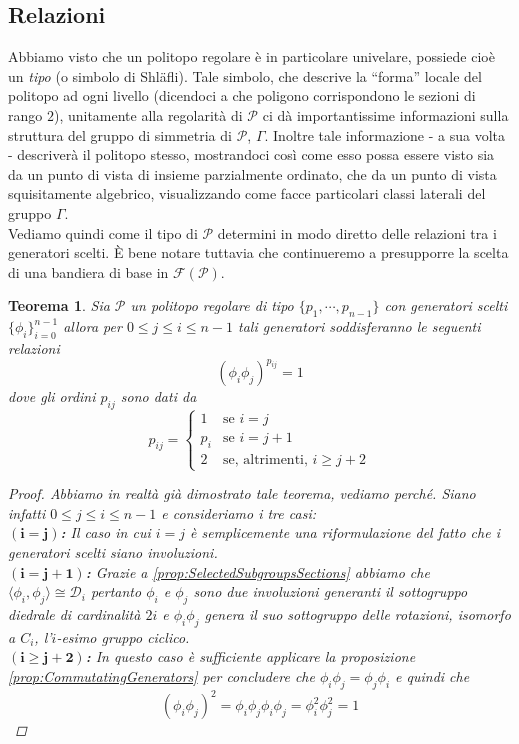 \documentclass[a4paper,12pt]{report}
\newcommand{\p}{\mathcal{P}}
\theoremstyle{plain}
\newtheorem{teo}{Teorema}[chapter]
\theoremstyle{definition}
\newcommand\point[1]{$\bm{(#1)}$\textbf{: }}
\newcommand\flag[1]{\mathcal{F}(#1)}
\begin{document}
\subsection{Relazioni}
Abbiamo visto che un politopo regolare \`e in particolare univelare, possiede cio\`e un \emph{tipo} (o simbolo di Shl\"afli). Tale simbolo,
che descrive la ``forma'' locale del politopo ad ogni livello (dicendoci a che poligono corrispondono le sezioni di rango $2$), unitamente
alla regolarit\`a di $\p$ ci d\`a importantissime informazioni sulla struttura del gruppo di simmetria di $\p$, $\Gamma$. Inoltre tale
informazione - a sua volta - descriver\`a il politopo stesso, mostrandoci cos\`i come esso possa essere visto sia da un punto di vista
di insieme parzialmente ordinato, che da un punto di vista squisitamente algebrico, visualizzando come facce particolari classi laterali
del gruppo $\Gamma$.\\
Vediamo quindi come il tipo di $\p$ determini in modo diretto delle relazioni tra i generatori scelti. \`E bene notare tuttavia che continueremo
a presupporre la scelta di una bandiera di base in $\flag{\p}$.
\begin{teo}
Sia $\p$ un politopo regolare di tipo $\{p_1,\cdots,p_{n-1}\}$ con generatori scelti $\{\phi_i\}_{i=0}^{n-1}$ allora per $0\leq j\leq i\leq n-1$
tali generatori soddisferanno le seguenti relazioni
\begin{equation*}
(\phi_i\phi_j)^{p_{ij}}=1
\end{equation*}
dove gli ordini $p_{ij}$ sono dati da
\begin{equation*}
p_{ij}=\begin{cases}
			1	&	\text{se }i=j\\
			p_i	&	\text{se }i=j+1\\
			2	&	\text{se, altrimenti, }i\geq j+2
		\end{cases}
\end{equation*}
\begin{proof}
Abbiamo in realt\`a gi\`a dimostrato tale teorema, vediamo perch\'e. Siano infatti $0\leq j\leq i\leq n-1$ e consideriamo i tre casi:\\
\point{i=j}Il caso in cui $i=j$ \`e semplicemente una riformulazione del fatto che i generatori scelti siano involuzioni.\\
\point{i=j+1}Grazie a \ref{prop:SelectedSubgroupsSections} abbiamo che $\langle\phi_i,\phi_j\rangle\cong\mathcal{D}_i$
pertanto $\phi_i$ e $\phi_j$ sono due involuzioni generanti il sottogruppo diedrale di cardinalit\`a $2i$ e $\phi_i\phi_j$ genera
il suo sottogruppo delle rotazioni, isomorfo a $C_i$, l'$i$-esimo gruppo ciclico.\\
\point{i\geq j+2}In questo caso \`e sufficiente applicare la proposizione \ref{prop:CommutatingGenerators} per concludere che
$\phi_i\phi_j=\phi_j\phi_i$ e quindi che
\begin{equation*}
(\phi_i\phi_j)^2=\phi_i\phi_j\phi_i\phi_j=\phi_i^2\phi_j^2=1
\end{equation*}
\end{proof}
\end{teo}
\end{document}
